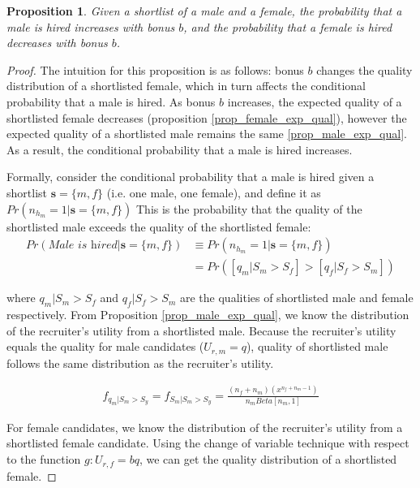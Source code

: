 \documentclass[11pt]{article}
\newtheorem{proposition}{Proposition}
\begin{document}
\begin{proposition}
    Given a shortlist of a male and a female, the probability that a male is hired increases with bonus $b$, and the probability that a female is hired decreases with bonus $b$.
\end{proposition}

\begin{proof}
    The intuition for this proposition is as follows: bonus $b$ changes the quality distribution of a shortlisted female, which in turn affects the conditional probability that a male is hired. As bonus $b$ increases, the expected quality of a shortlisted female decreases (proposition \ref{prop_female_exp_qual}), however the expected quality of a shortlisted male remains the same \ref{prop_male_exp_qual}. As a result, the conditional probability that a male is hired increases.

    Formally, consider the conditional probability that a male is hired given a shortlist $\bm{s}=\{m,f\}$ (i.e. one male, one female), and define it as $Pr(n_{h_m}=1|\bm{s}=\{m,f\})$ This is the probability that the quality of the shortlisted male exceeds the quality of the shortlisted female:
    \begin{align*}
        Pr(\textit{Male is hired}|\bm{s}=\{m,f\}) & \equiv Pr(n_{h_m}=1|\bm{s}=\{m,f\})     \\
                                                  & = Pr([q_m|S_m > S_f] > [q_f|S_f > S_m])
    \end{align*}

    where $q_m|S_m > S_f$ and $q_f|S_f > S_m$ are the qualities of shortlisted male and female respectively. From Proposition \ref{prop_male_exp_qual}, we know the distribution of the recruiter's utility from a shortlisted male. Because the recruiter's utility equals the quality for male candidates ($U_{r,m} = q$), quality of shortlisted male follows the same distribution as the recruiter's utility.

    \begin{align*}
        f_{q_m|S_m > S_y} = f_{S_m|S_m > S_y} = \frac{(n_f+n_m)(x^{n_f+n_m-1})}{n_mBeta[n_m,1]}
    \end{align*}

    For female candidates, we know the distribution of the recruiter's utility from a shortlisted female candidate. Using the change of variable technique with respect to the function $g: U_{r,f} = bq$, we can get the quality distribution of a shortlisted female.


\end{proof}
\end{document}
